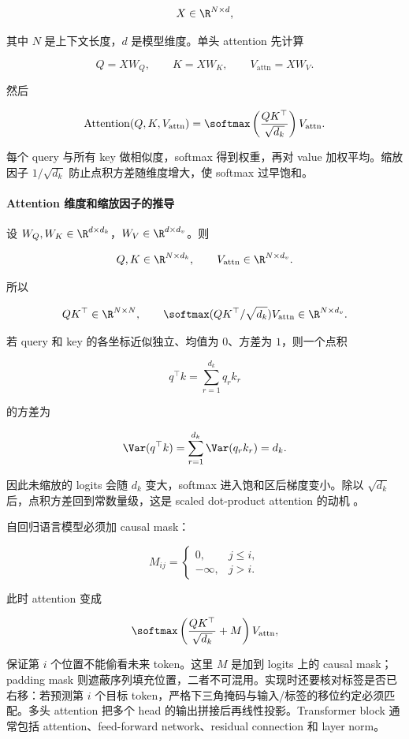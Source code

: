 \[
  X\in\R^{N\times d},
\]

其中 \(N\) 是上下文长度，\(d\) 是模型维度。单头 attention 先计算

\[
  Q=XW_Q,
  \qquad
  K=XW_K,
  \qquad
  V_{\mathrm{attn}}=XW_V.
\]

然后

\[
  \operatorname{Attention}(Q,K,V_{\mathrm{attn}})
  =
  \softmax
  \left(
    \frac{QK^\top}{\sqrt{d_k}}
  \right)V_{\mathrm{attn}}.
\]

每个 query 与所有 key 做相似度，softmax 得到权重，再对 value 加权平均。缩放因子 \(1/\sqrt{d_k}\) 防止点积方差随维度增大，使 softmax 过早饱和。

\paragraph{Attention 维度和缩放因子的推导}

设 \(W_Q,W_K\in\R^{d\times d_k}\)，\(W_V\in\R^{d\times d_v}\)。则

\[
  Q,K\in\R^{N\times d_k},
  \qquad
  V_{\mathrm{attn}}\in\R^{N\times d_v}.
\]

所以

\[
  QK^\top\in\R^{N\times N},
  \qquad
  \softmax(QK^\top/\sqrt{d_k})V_{\mathrm{attn}}\in\R^{N\times d_v}.
\]

若 query 和 key 的各坐标近似独立、均值为 \(0\)、方差为 \(1\)，则一个点积

\[
  q^\top k=\sum_{r=1}^{d_k}q_r k_r
\]

的方差为

\[
  \Var(q^\top k)
  =
  \sum_{r=1}^{d_k}\Var(q_r k_r)
  =
  d_k.
\]

因此未缩放的 logits 会随 \(d_k\) 变大，softmax 进入饱和区后梯度变小。除以 \(\sqrt{d_k}\) 后，点积方差回到常数量级，这是 scaled dot-product attention 的动机 \parencite{vaswani2017attention,jurafsky2026slp}。

自回归语言模型必须加 causal mask：

\[
  M_{ij}
  =
  \begin{cases}
    0, & j\le i,\\
    -\infty, & j>i.
  \end{cases}
\]

此时 attention 变成

\[
  \softmax
  \left(
    \frac{QK^\top}{\sqrt{d_k}}+M
  \right)V_{\mathrm{attn}},
\]

保证第 \(i\) 个位置不能偷看未来 token。这里 \(M\) 是加到 logits 上的 causal mask；padding mask 则遮蔽序列填充位置，二者不可混用。实现时还要核对标签是否已右移：若预测第 \(i\) 个目标 token，严格下三角掩码与输入/标签的移位约定必须匹配。多头 attention 把多个 head 的输出拼接后再线性投影。Transformer block 通常包括 attention、feed-forward network、residual connection 和 layer norm。

